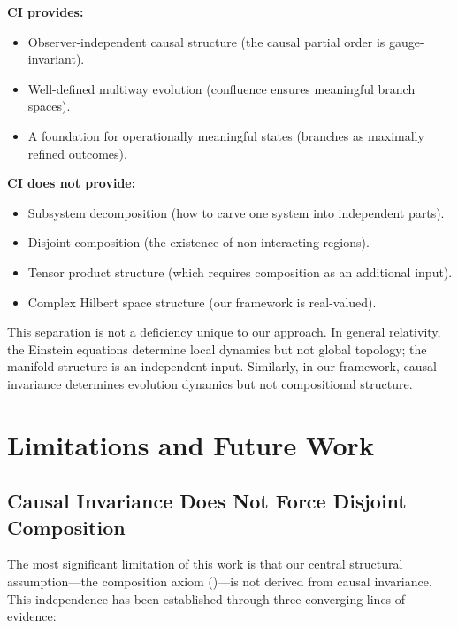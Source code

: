 \documentclass[11pt,a4paper]{article}
\theoremstyle{definition}
\theoremstyle{remark}
\begin{document}
\textbf{CI provides:}
\begin{itemize}
\item Observer-independent causal structure (the causal partial order is
  gauge-invariant).
\item Well-defined multiway evolution (confluence ensures meaningful
  branch spaces).
\item A foundation for operationally meaningful states (branches as
  maximally refined outcomes).
\end{itemize}

\textbf{CI does not provide:}
\begin{itemize}
\item Subsystem decomposition (how to carve one system into independent
  parts).
\item Disjoint composition (the existence of non-interacting regions).
\item Tensor product structure (which requires composition as an
  additional input).
\item Complex Hilbert space structure (our framework is real-valued).
\end{itemize}

This separation is not a deficiency unique to our approach. In general
relativity, the Einstein equations determine local dynamics but not
global topology; the manifold structure is an independent input.
Similarly, in our framework, causal invariance determines evolution
dynamics but not compositional structure.

\section{Limitations and Future Work}
\label{sec:limitations}

\subsection{Causal Invariance Does Not Force Disjoint Composition}
\label{sec:lim_composition}

The most significant limitation of this work is that our central
structural assumption---the composition axiom ()---is
not derived from causal invariance. This independence has been established
through three converging lines of evidence:
\end{document}
